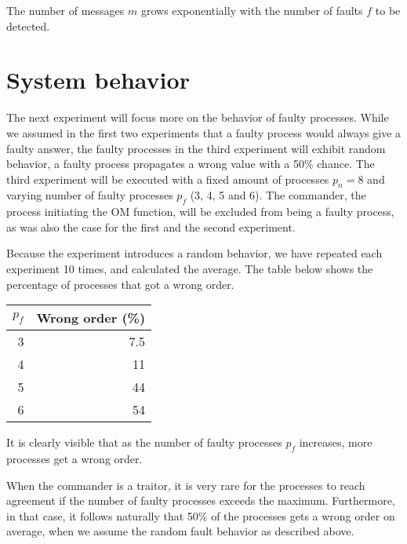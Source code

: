\documentclass[a4paper,12pt]{article}
\begin{document}
The number of messages $m$ grows exponentially with the number of faults $f$ to be detected.

\section{System behavior}
The next experiment will focus more on the behavior of faulty processes. 
While we assumed in the first two experiments that a faulty process would always give a faulty answer, the faulty processes in the third experiment will exhibit random behavior, a faulty process propagates a wrong value with a 50\% chance. 
The third experiment will be executed with a fixed amount of processes $p_n = 8$ and varying number of faulty processes $p_f$ (3, 4, 5 and 6). 
The commander, the process initiating the OM function, will be excluded from being a faulty process, as was also the case for the first and the second experiment.

Because the experiment introduces a random behavior, we have repeated each experiment 10 times, and calculated the average. The table below shows the percentage of processes that got a wrong order.


\begin{table}[!ht]
	\centering
	\begin{tabular}{r|r}
		$p_f$ & Wrong order (\%) \\ \hline
		3 & 7.5 \\
		4 & 11 \\
		5 & 44 \\
		6 & 54
	\end{tabular}
\end{table}

It is clearly visible that as the number of faulty processes $p_f$ increases, more processes get a wrong order.

When the commander is a traitor, it is very rare for the processes to reach agreement if the number of faulty processes exceeds the maximum. Furthermore, in that case, it follows naturally that 50\% of the processes gets a wrong order on average, when we assume the random fault behavior as described above.
\end{document}
